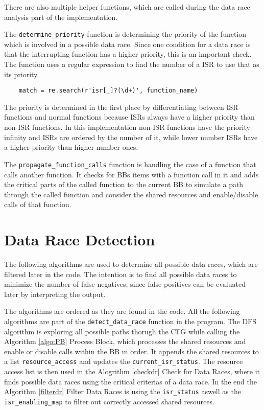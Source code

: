 \documentclass[
fancyheadings, %
%
%
]{stsreprt}
\begin{document}
{There are also multiple helper functions, which are called during the data race analysis part of the implementation. 

The \texttt{determine\_priority} function is determining the priority of the function which is involved in a possible data race. Since one condition for a data race is that the interrupting function has a higher priority, this is an important check. The function uses a regular expression to find the number of a \ac{ISR} to use that as its priority.
\begin{lstlisting}
	match = re.search(r'isr[_]?(\d+)', function_name)
\end{lstlisting}
The priority is determined in the first place by differentiating between \ac{ISR} functions and normal functions because \acp{ISR} always have a higher priority than non-\ac{ISR} functions. In this implementation non-\Ac{ISR} functions have the priority infinity and \acp{ISR} are ordered by the number of it, while lower number \acp{ISR} have a higher priority than higher number ones.
	
The \texttt{propagate\_function\_calls} function is handling the case of a function that calls another function. It checks for \acp{BB} items with a function call in it and adds the critical parts of the called function to the current \ac{BB} to simulate a path through the called function and consider the shared resources and enable/disable calls of that function.

\section{Data Race Detection}
The following algorithms are used to determine all possible data races, which are filtered later in the code. The intention is to find all possible data races to minimize the number of false negatives, since false positives can be evaluated later by interpreting the output.

 The algorithms are ordered as they are found in the code. All the following algorithms are part of the \texttt{detect\_data\_race} function in the program. The \ac{DFS} algorithm is exploring all possible paths thorugh the \ac{CFG} while calling the Algorithm \ref{algo:PB} Process Block, which processes the shared resources and enable or disable calls within the \ac{BB} in order. It appends the shared resources to a list \texttt{resource\_access} and updates the \texttt{current\_isr\_status}. The resource access list is then used in the Alogrithm \ref{checkdr} Check for Data Races, where it finds possible data races using the critical criterias of a data race. In the end the Algorithm \ref{filterdr} Filter Data Races is using the \texttt{isr\_status} aswell as the \texttt{isr\_enabling\_map} to filter out correctly accessed shared resources.

}
\end{document}
